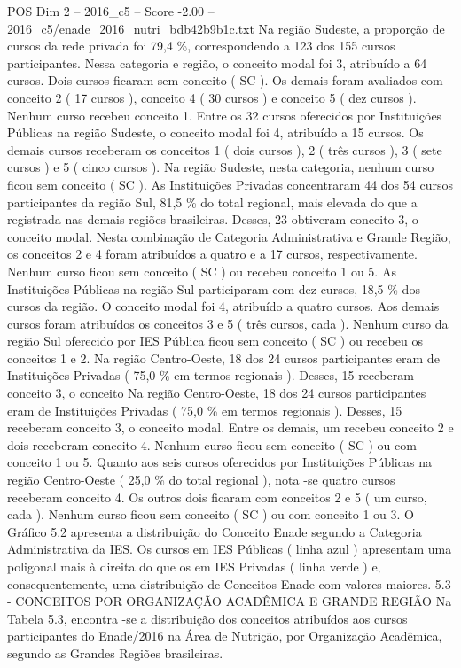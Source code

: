 \begin{textsample}{POS Dim 2 – 2016\_c5 – Score -2.00 – 2016\_c5/enade\_2016\_nutri\_bdb42b9b1c.txt}
Na região Sudeste, a proporção de cursos da rede privada foi 79,4 \%, correspondendo a 123 dos 155 cursos participantes.
Nessa categoria e região, o conceito modal foi 3, atribuído a 64 cursos.
Dois cursos ficaram sem conceito ( SC ).
Os demais foram avaliados com conceito 2 ( 17 cursos ), conceito 4 ( 30 cursos ) e conceito 5 ( dez cursos ).
Nenhum curso recebeu conceito 1.
Entre os 32 cursos oferecidos por Instituições Públicas na região Sudeste, o conceito modal foi 4, atribuído a 15 cursos.
Os demais cursos receberam os conceitos 1 ( dois cursos ), 2 ( três cursos ), 3 ( sete cursos ) e 5 ( cinco cursos ).
Na região Sudeste, nesta categoria, nenhum curso ficou sem conceito ( SC ).
As Instituições Privadas concentraram 44 dos 54 cursos participantes da região Sul, 81,5 \% do total regional, mais elevada do que a registrada nas demais regiões brasileiras.
Desses, 23 obtiveram conceito 3, o conceito modal.
Nesta combinação de Categoria Administrativa e Grande Região, os conceitos 2 e 4 foram atribuídos a quatro e a 17 cursos, respectivamente.
Nenhum curso ficou sem conceito ( SC ) ou recebeu conceito 1 ou 5.
As Instituições Públicas na região Sul participaram com dez cursos, 18,5 \% dos cursos da região.
O conceito modal foi 4, atribuído a quatro cursos.
Aos demais cursos foram atribuídos os conceitos 3 e 5 ( três cursos, cada ).
Nenhum curso da região Sul oferecido por IES Pública ficou sem conceito ( SC ) ou recebeu os conceitos 1 e 2.
Na região Centro-Oeste, 18 dos 24 cursos participantes eram de Instituições Privadas ( 75,0 \% em termos regionais ).
Desses, 15 receberam conceito 3, o conceito Na região Centro-Oeste, 18 dos 24 cursos participantes eram de Instituições Privadas ( 75,0 \% em termos regionais ).
Desses, 15 receberam conceito 3, o conceito modal.
Entre os demais, um recebeu conceito 2 e dois receberam conceito 4.
Nenhum curso ficou sem conceito ( SC ) ou com conceito 1 ou 5.
Quanto aos seis cursos oferecidos por Instituições Públicas na região Centro-Oeste ( 25,0 \% do total regional ), nota -se quatro cursos receberam conceito 4.
Os outros dois ficaram com conceitos 2 e 5 ( um curso, cada ).
Nenhum curso ficou sem conceito ( SC ) ou com conceito 1 ou 3.
O Gráfico 5.2 apresenta a distribuição do Conceito Enade segundo a Categoria Administrativa da IES.
Os cursos em IES Públicas ( linha azul ) apresentam uma poligonal mais à direita do que os em IES Privadas ( linha verde ) e, consequentemente, uma distribuição de Conceitos Enade com valores maiores. 5.3 - CONCEITOS POR ORGANIZAÇÃO ACADÊMICA E GRANDE REGIÃO Na Tabela 5.3, encontra -se a distribuição dos conceitos atribuídos aos cursos participantes do Enade/2016 na Área de Nutrição, por Organização Acadêmica, segundo as Grandes Regiões brasileiras.

\end{textsample}
